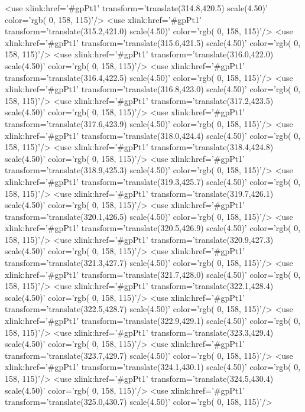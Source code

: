 	<use xlink:href='#gpPt1' transform='translate(314.8,420.5) scale(4.50)' color='rgb(  0, 158, 115)'/>
	<use xlink:href='#gpPt1' transform='translate(315.2,421.0) scale(4.50)' color='rgb(  0, 158, 115)'/>
	<use xlink:href='#gpPt1' transform='translate(315.6,421.5) scale(4.50)' color='rgb(  0, 158, 115)'/>
	<use xlink:href='#gpPt1' transform='translate(316.0,422.0) scale(4.50)' color='rgb(  0, 158, 115)'/>
	<use xlink:href='#gpPt1' transform='translate(316.4,422.5) scale(4.50)' color='rgb(  0, 158, 115)'/>
	<use xlink:href='#gpPt1' transform='translate(316.8,423.0) scale(4.50)' color='rgb(  0, 158, 115)'/>
	<use xlink:href='#gpPt1' transform='translate(317.2,423.5) scale(4.50)' color='rgb(  0, 158, 115)'/>
	<use xlink:href='#gpPt1' transform='translate(317.6,423.9) scale(4.50)' color='rgb(  0, 158, 115)'/>
	<use xlink:href='#gpPt1' transform='translate(318.0,424.4) scale(4.50)' color='rgb(  0, 158, 115)'/>
	<use xlink:href='#gpPt1' transform='translate(318.4,424.8) scale(4.50)' color='rgb(  0, 158, 115)'/>
	<use xlink:href='#gpPt1' transform='translate(318.9,425.3) scale(4.50)' color='rgb(  0, 158, 115)'/>
	<use xlink:href='#gpPt1' transform='translate(319.3,425.7) scale(4.50)' color='rgb(  0, 158, 115)'/>
	<use xlink:href='#gpPt1' transform='translate(319.7,426.1) scale(4.50)' color='rgb(  0, 158, 115)'/>
	<use xlink:href='#gpPt1' transform='translate(320.1,426.5) scale(4.50)' color='rgb(  0, 158, 115)'/>
	<use xlink:href='#gpPt1' transform='translate(320.5,426.9) scale(4.50)' color='rgb(  0, 158, 115)'/>
	<use xlink:href='#gpPt1' transform='translate(320.9,427.3) scale(4.50)' color='rgb(  0, 158, 115)'/>
	<use xlink:href='#gpPt1' transform='translate(321.3,427.7) scale(4.50)' color='rgb(  0, 158, 115)'/>
	<use xlink:href='#gpPt1' transform='translate(321.7,428.0) scale(4.50)' color='rgb(  0, 158, 115)'/>
	<use xlink:href='#gpPt1' transform='translate(322.1,428.4) scale(4.50)' color='rgb(  0, 158, 115)'/>
	<use xlink:href='#gpPt1' transform='translate(322.5,428.7) scale(4.50)' color='rgb(  0, 158, 115)'/>
	<use xlink:href='#gpPt1' transform='translate(322.9,429.1) scale(4.50)' color='rgb(  0, 158, 115)'/>
	<use xlink:href='#gpPt1' transform='translate(323.3,429.4) scale(4.50)' color='rgb(  0, 158, 115)'/>
	<use xlink:href='#gpPt1' transform='translate(323.7,429.7) scale(4.50)' color='rgb(  0, 158, 115)'/>
	<use xlink:href='#gpPt1' transform='translate(324.1,430.1) scale(4.50)' color='rgb(  0, 158, 115)'/>
	<use xlink:href='#gpPt1' transform='translate(324.5,430.4) scale(4.50)' color='rgb(  0, 158, 115)'/>
	<use xlink:href='#gpPt1' transform='translate(325.0,430.7) scale(4.50)' color='rgb(  0, 158, 115)'/>
